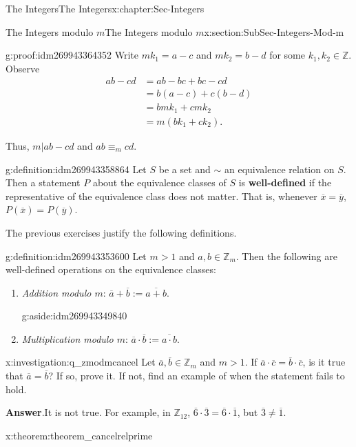 \documentclass[oneside,10pt,]{book}
\newcommand{\terminology}[1]{\textbf{#1}}
\numberwithin{equation}{section}
\def\Z{{\mathbb Z}}
\newcommand{\amp}{&}
\begin{document}
\begin{chapterptx}{The Integers}{}{The Integers}{}{}{x:chapter:Sec-Integers}
\begin{sectionptx}{The Integers modulo \(m\)}{}{The Integers modulo \(m\)}{}{}{x:section:SubSec-Integers-Mod-m}
\begin{proofptx}{}{g:proof:idm269943364352}
Write \(mk_1 = a-c\) and \(m k_2 = b-d\) for some \(k_1,k_2\in \Z\). Observe%
\begin{align*}
ab -cd \amp = ab - bc + bc - cd\\
\amp = b(a-c) + c(b-d)\\
\amp = bmk_1 + cmk_2\\
\amp = m(bk_1 + ck_2)\text{.}
\end{align*}
%
\par
Thus, \(m|ab-cd\) and \(ab \equiv_m cd\).%
\end{proofptx}
\begin{definition}{}{g:definition:idm269943358864}%
Let \(S\) be a set and \(\sim\) an equivalence relation on \(S\). Then a statement \(P\) about the equivalence classes of \(S\) is \terminology{well-defined} if the representative of the equivalence class does not matter. That is, whenever \(\overline{x} = \overline{y}\), \(P(\overline{x}) = P(\overline{y})\).%
\end{definition}
The previous exercises justify the following definitions.%
\begin{definition}{}{g:definition:idm269943353600}%
Let \(m > 1\) and \(a,b\in \Z_m\). Then the following are well-defined operations on the equivalence classes:%
\begin{enumerate}
\item{}\emph{Addition modulo \(m\)}: \(\overline{a} + \overline{b} := \overline{a+b}\). \begin{aside}{}{g:aside:idm269943349840}%
\end{aside}
%
\item{}\emph{Multiplication modulo \(m\)}: \(\overline{a}\cdot \overline{b} := \overline{a\cdot b}\).%
\end{enumerate}
%
\end{definition}
\begin{investigation}{}{x:investigation:q_zmodmcancel}%
Let \(\overline{a},\overline{b}\in \Z_m\) and \(m > 1\). If \(\overline{a}\cdot \overline{c} = \overline{b}\cdot \overline{c}\), is it true that \(\overline{a} = \overline{b}\)? If so, prove it. If not, find an example of when the statement fails to hold.%
\par\smallskip%
\noindent\textbf{Answer}.\hypertarget{g:answer:idm269943342272}{}\quad{}It is not true. For example, in \(\Z_{12}\), \(\overline{6}\cdot \overline{3} = \overline{6}\cdot\overline{1}\), but \(\overline{3}\ne \overline{1}\).%
\end{investigation}
\begin{theorem}{}{}{x:theorem:theorem_cancelrelprime}%

\end{theorem}
\end{sectionptx}
\end{chapterptx}
\end{document}
